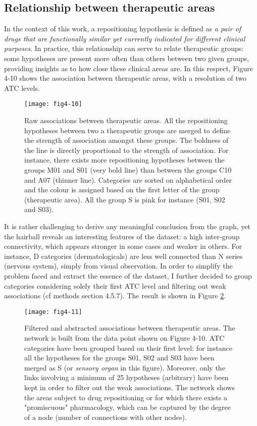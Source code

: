\subsection{Relationship between therapeutic areas}
In the context of this work, a repositioning hypothesis is defined as \emph{a pair of drugs that are functionally similar yet currently indicated for different clinical purposes}. In practice, this relationship can serve to relate therapeutic groups: some hypotheses are present more often than others between two given groups, providing insights as to how close these clinical areas are. In this respect, Figure 4-10 shows the association between therapeutic areas, with a resolution of two ATC levels.

\begin{figure}[H]
    \centering
    \texttt{[image: fig4-10]}
    \caption{Raw associations between therapeutic areas. All the repositioning hypotheses between two a therapeutic groups are merged to define the strength of association amongst these groups. The boldness of the line is directly proportional to the strength of association. For instance, there exists more repositioning hypotheses between the groups M01 and S01 (very bold line) than between the groups C10 and A07 (thinner line). Categories are sorted on alphabetical order and the colour is assigned based on the first letter of the group (therapeutic area). All the group S is pink for instance (S01, S02 and S03).}
    \label{fig4-10}
\end{figure}

It is rather challenging to derive any meaningful conclusion from the graph, yet the hairball reveals an interesting features of the dataset: a high inter-group connectivity, which appears stronger in some cases and weaker in others. For instance, D categories (dermatologicals) are less well connected than N series (nervous system), simply from visual observation. In order to simplify the problem faced and extract the essence of the dataset, I further decided to group categories considering solely their first ATC level and filtering out weak associations (cf methods section 4.5.7). The result is shown in Figure \ref{fig4-11}.

\begin{figure}[H]
    \centering
    \texttt{[image: fig4-11]}
    \caption{Filtered and abstracted associations between therapeutic areas. The network is built from the data point shown on Figure 4-10. ATC categories have been grouped based on their first level: for instance all the hypotheses for the groups S01, S02 and S03 have been merged as S (or \emph{sensory organ} in this figure). Moreover, only the links involving a minimum of 25 hypotheses (arbitrary) have been kept in order to filter out the weak associations. The network shows the areas subject to drug repositioning or for which there exists a "promiscuous" pharmacology, which can be captured by the degree of a node (number of connections with other nodes).}
    \label{fig4-11}
\end{figure}

